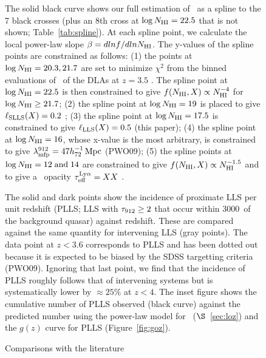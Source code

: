 \documentclass[12pt,preprint]{aastex}
\begin{document}
\begin{figure}
\caption{The solid black curve shows our full estimation of
\fnhi\ as a spline to the 7 black crosses (plus an 8th cross
at $\log N_{\rm HI} = 22.5$ that is not shown; Table~\ref{tab:spline}).
At each spline point, we calculate the local power-law slope
$\beta = dlnf/dlnN_{\rm HI}$.  The y-values of the
spline points are constrained as follows: 
(1) the points at $\log N_{\rm HI} = 20.3, 21.7$ are set to minimize
$\chi^2$ from the binned evaluations of \fnhi\ of the DLAs
at $z=3.5$ \citep{pw09}.  The spline point at $\log N_{\rm HI} = 22.5$ is then
constrained to give $f(N_{\rm HI},X) \propto N_{\rm HI}^{-4}$ for
$\log N_{\rm HI} \ge 21.7$;
(2) the spline point at $\log N_{\rm HI} = 19$ is placed to give
$\ell_{\rm{SLLS}}(X) = 0.2$ \citep{opb+07};
(3) the spline point at $\log N_{\rm HI} = 17.5$ is constrained
to give $\ell_{\rm{LLS}}(X) = 0.5$ (this paper);
(4) the spline point at $\log N_{\rm HI} = 16$, whose x-value is 
the most arbitrary, is constrained to give $\lambda_{\rm mfp}^{912} = 47 {h_{72}^{-1} \, \rm Mpc}$ (PWO09);
(5) the spline points at $\log N_{\rm HI} = 12 \; {\rm and} \; 14$
are constrained to give $f(N_{\rm HI},X) \propto N_{\rm HI}^{-1.5}$ and to
give a \lya\ opacity $\tau_{\rm eff}^{\rm Ly\alpha} = XX$ \citep{fpl+08}.
}
\label{fig:splinefN}
\end{figure}



\begin{figure}
\caption{The solid and dark points show the incidence of
proximate LLS per unit redshift (PLLS; LLS with $\tau_{\rm 912} \ge 2$ that 
occur within 3000\kms\ of the background quasar) against redshift.
These are compared against the same quantity for intervening LLS
(gray points).  The data point at $z<3.6$ corresponds to PLLS
and has been dotted out because it is expected to be biased
by the SDSS targetting criteria (PWO09).  Ignoring that last
point, we find that the incidence of PLLS roughly follows that
of intervening systems but is systematically lower by $\approx 25\%$
at $z<4$.  The inset figure shows the cumulative number of 
PLLS observed (black curve) against the predicted number using
the power-law model for \lzlls\ ($\S$~\ref{sec:loz}) and
the $g(z)$ curve for PLLS (Figure~\ref{fig:goz}).
}
\label{fig:prox}
\end{figure}


\begin{figure}
\caption{Comparisons with the literature
}
\label{fig:literature}
\end{figure}
\end{document}
